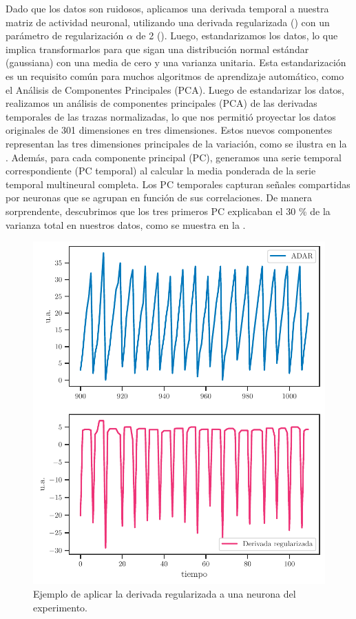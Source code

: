  Dado que los datos son ruidosos, aplicamos una derivada temporal a nuestra matriz de actividad neuronal, utilizando una derivada regularizada () con un parámetro de regularización $\alpha$ de 2 (). Luego, estandarizamos los datos, lo que implica transformarlos para que sigan una distribución normal estándar (gaussiana) con una media de cero y una varianza unitaria. Esta estandarización es un requisito común para muchos algoritmos de aprendizaje automático, como el Análisis de Componentes Principales (PCA).  Luego de estandarizar los datos, realizamos un análisis de componentes principales (PCA) de las derivadas temporales de las trazas normalizadas, lo que nos permitió proyectar los datos originales de 301 dimensiones en tres dimensiones. Estos nuevos componentes representan las tres dimensiones principales de la variación, como se ilustra en la . Además, para cada componente principal (PC), generamos una serie temporal correspondiente (PC temporal) al calcular la media ponderada de la serie temporal multineural completa. Los PC temporales capturan señales compartidas por neuronas que se agrupan en función de sus correlaciones. De manera sorprendente, descubrimos que los tres primeros PC explicaban el 30 \% de la varianza total en nuestros datos, como se muestra en la .
 
 
  \begin{figure}[h!]
 	\centering\includegraphics[width=\imsize]{derivada_robot.pdf}
 	\caption[Ejemplo de aplicar la derivada regularizada a una neurona del experimento.]{Ejemplo de aplicar la derivada regularizada a una neurona del experimento.}\label{fig:derivada_regularizada}
 \end{figure}
 
